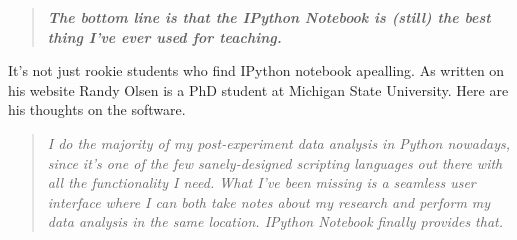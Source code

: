 \documentclass[11pt, a4paper]{article}  %
\begin{document}
\begin{multicols}{2}
\begin{quote}
\textit{\textbf{The bottom line is that the IPython Notebook is (still) the
best thing I've ever used for teaching.}}
\end{quote}

It's not just rookie students who find IPython notebook apealling. As written
on his website Randy Olsen is a PhD student at Michigan State University. Here
are his thoughts on the software. \cite{olson}

\begin{quote}
\textit{I do the majority of my post-experiment data analysis in Python
nowadays, since it’s one of the few sanely-designed scripting languages out
there with all the functionality I need. What I’ve been missing is a seamless
user interface where I can both take notes about my research and perform my
data analysis in the same location. IPython Notebook finally provides that.}
\end{quote}













\end{multicols}



\end{document}
